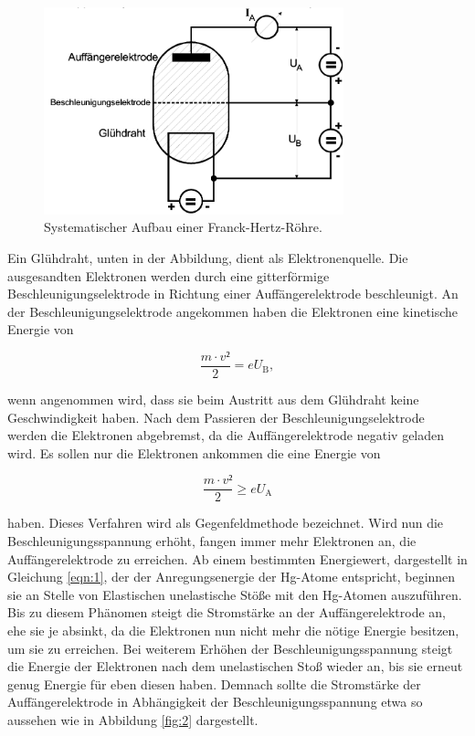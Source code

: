 \begin{figure}[H]
  \centering
  \includegraphics[height=6cm]{ressources/aufbau.png}
  \caption{Systematischer Aufbau einer Franck-Hertz-Röhre. \cite{skript}}
  \label{fig:1}
\end{figure}

Ein Glühdraht, unten in der Abbildung, dient als Elektronenquelle.
Die ausgesandten Elektronen werden durch eine gitterförmige Beschleunigungselektrode in Richtung einer Auffängerelektrode beschleunigt.
An der Beschleunigungselektrode angekommen haben die Elektronen eine kinetische Energie von

\begin{equation}
  \frac{m \cdot v²}{2} = eU_{\text{B}}, \label{eqn:3}
\end{equation}

wenn angenommen wird, dass sie beim Austritt aus dem Glühdraht keine Geschwindigkeit haben.
Nach dem Passieren der Beschleunigungselektrode werden die Elektronen abgebremst, da die Auffängerelektrode negativ geladen wird.
Es sollen nur die Elektronen ankommen die eine Energie von

\begin{equation}
  \frac{m \cdot v²}{2} \ge eU_{\text{A}} \label{eqn:4}
\end{equation}

haben.
Dieses Verfahren wird als Gegenfeldmethode bezeichnet.
Wird nun die Beschleunigungsspannung erhöht, fangen immer mehr Elektronen an, die Auffängerelektrode zu erreichen.
Ab einem bestimmten Energiewert, dargestellt in Gleichung \ref{eqn:1}, der der Anregungsenergie der Hg-Atome entspricht, beginnen sie an Stelle von Elastischen unelastische Stöße mit den Hg-Atomen auszuführen.
Bis zu diesem Phänomen steigt die Stromstärke an der Auffängerelektrode an, ehe sie je absinkt, da die Elektronen nun nicht mehr die nötige Energie besitzen, um sie zu erreichen.
Bei weiterem Erhöhen der Beschleunigungsspannung steigt die Energie der Elektronen nach dem unelastischen Stoß wieder an, bis sie erneut genug Energie für eben diesen haben.
Demnach sollte die Stromstärke der Auffängerelektrode in Abhängigkeit der Beschleunigungsspannung etwa so aussehen wie in Abbildung \ref{fig:2} dargestellt.

